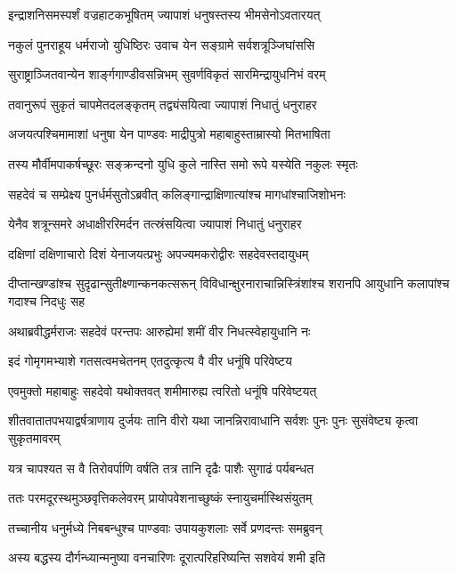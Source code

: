 \twolineshloka
{इन्द्राशनिसमस्पर्शं वज्रहाटकभूषितम्}
{ज्यापाशं धनुषस्तस्य भीमसेनोऽवतारयत्}


\twolineshloka
{नकुलं पुनराहूय धर्मराजो युधिष्ठिरः}
{उवाच येन सङ्ग्रामे सर्वशत्रूञ्जिघांससि}


\twolineshloka
{सुराष्ट्राञ्जितवान्येन शार्ङ्गगाण्डीवसन्निभम्}
{सुवर्णविकृतं सारमिन्द्रायुधनिभं वरम्}


\twolineshloka
{तवानुरूपं सुकृतं चापमेतदलङ्कृतम्}
{तद्व्यंसयित्वा ज्यापाशं निधातुं धनुराहर}



\twolineshloka
{अजयत्पश्चिमामाशां धनुषा येन पाण्डवः}
{माद्रीपुत्रो महाबाहुस्ताम्रास्यो मितभाषिता}


\twolineshloka
{तस्य मौर्वीमपाकर्षच्छूरः सङ्क्रन्दनो युधि}
{कुले नास्ति समो रूपे यस्येति नकुलः स्मृतः}


\twolineshloka
{सहदेवं च सम्प्रेक्ष्य पुनर्धर्मसुतोऽब्रवीत्}
{कलिङ्गान्द्राक्षिणात्यांश्च मागधांश्चाजिशोभनः}


\twolineshloka
{येनैव शत्रून्समरे अधाक्षीररिमर्दन}
{तत्स्रंसयित्वा ज्यापाशं निधातुं धनुराहर}



\twolineshloka
{दक्षिणां दक्षिणाचारो दिशं येनाजयत्प्रभुः}
{अपज्यमकरोद्वीरः सहदेवस्तदायुधम्}


\threelineshloka
{दीप्तान्खण्डांश्च सुदृढान्सुतीक्ष्णान्कनकत्सरून्}
{विविधान्क्षुरनाराचान्निस्त्रिंशांश्च शरानपि}
{आयुधानि कलापांश्च गदाश्च निदधुः सह}


\twolineshloka
{अथाब्रवीद्धर्मराजः सहदेवं परन्तपः}
{आरुह्येमां शमीं वीर निधत्स्वेहायुधानि नः}


\twolineshloka
{इदं गोमृगमभ्याशे गतसत्वमचेतनम्}
{एतदुत्कृत्य वै वीर धनूंषि परिवेष्टय}


\twolineshloka
{एवमुक्तो महाबाहुः सहदेवो यथोक्तवत्}
{शमीमारुह्य त्वरितो धनूंषि परिवेष्टयत्}


\threelineshloka
{शीतवातातपभयाद्वर्षत्राणाय दुर्जयः}
{तानि वीरो यथा जानन्निरावाधानि सर्वशः}
{पुनः पुनः सुसंवेष्ट्य कृत्वा सुकृतमावरम्}


\twolineshloka
{यत्र चापश्यत स वै तिरोवर्पाणि वर्षति}
{तत्र तानि दृढैः पाशैः सुगाढं पर्यबन्धत}


\twolineshloka
{ततः परमदूरस्थमुञ्छवृत्तिकलेवरम्}
{प्रायोपवेशनाच्छुष्कं स्नायुचर्मास्थिसंयुतम्}


\twolineshloka
{तच्चानीय धनुर्मध्ये निबबन्धुश्च पाण्डवाः}
{उपायकुशलाः सर्वे प्रणदन्तः समब्रुवन्}


\twolineshloka
{अस्य बद्धस्य दौर्गन्ध्यान्मनुष्या वनचारिणः}
{दूरात्परिहरिष्यन्ति सशवेयं शमी इति}


